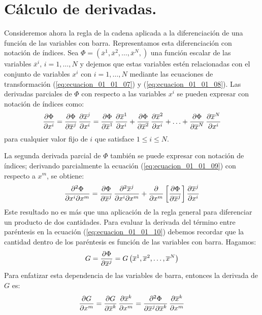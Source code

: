 \documentclass[hidelinks,12pt]{article}
\begin{document}
\section{Cálculo de derivadas.}

Consideremos ahora la regla de la cadena aplicada a la diferenciación de una función de las variables con barra. Representamos esta diferenciación con notación de índices. Sea $\Phi = \left( \overline{x}^{1},  \overline{x}^{2}, \ldots, \overline{x}^{N}, \right)$ una función escalar de las variables $\overline{x}^{i}, \, i = 1, \ldots, N$ y dejemos que estas variables estén relacionadas con el conjunto de variables $x^{i}$  con $i = 1, \ldots, N$ mediante las ecuaciones de transformación (\ref{eq:ecuacion_01_01_07}) y (\ref{eq:ecuacion_01_01_08}). Las derivadas parciales de $\Phi$ con respecto a las variables $x^{i}$ se pueden expresar con notación de índices como:
\begin{align}
\pdv{\Phi}{x^{i}} = \pdv{\Phi}{\overline{x}^{j}} \, \pdv{\overline{x}^{j}}{x^i} = \pdv{\Phi}{\overline{x}^{1}} \, \pdv{\overline{x}^{1}}{x^{i}} + \pdv{\Phi}{\overline{x}^{2}} \, \pdv{\overline{x}^{2}}{x^{i}} + \ldots + \pdv{\Phi}{\overline{x}^{N}} \, \pdv{\overline{x}^{N}}{x^{i}}
\label{eq:ecuacion_01_01_09}
\end{align}
para cualquier valor fijo de $i$ que satisface $1 \leq i \leq N$.
\par
La segunda derivada parcial de $\Phi$ también se puede expresar con notación de índices; derivando parcialmente la ecuación (\ref{eq:ecuacion_01_01_09}) con respecto a $x^{m}$, se obtiene:
\begin{align}
\pdv[2]{\Phi}{x^{i}}{x^{m}} = \pdv{\Phi}{\overline{x}^{j}} \, \pdv[2]{\overline{x}^{j}}{x^{i}}{x^{m}} + \pdv{x^{m}} \left[ \pdv{\Phi}{\overline{x}^{j}} \right] \pdv{\overline{x}^{j}}{x^{i}}
\label{eq:ecuacion_01_01_10}
\end{align}
Este resultado no es más que una aplicación de la regla general para diferenciar un producto de dos cantidades. Para evaluar la derivada del término entre paréntesis en la ecuación (\ref{eq:ecuacion_01_01_10}) debemos recordar que la cantidad dentro de los paréntesis es función de las variables con barra. Hagamos:
\begin{align*}
G = \pdv{\Phi}{\overline{x}^{j}} = G \left( \overline{x}^{1}, \overline{x}^{2}, \ldots, \overline{x}^{N} \right)
\end{align*}
Para enfatizar esta dependencia de las variables de barra, entonces la derivada de $G$ es:
\begin{align}
\pdv{G}{x^{m}} = \pdv{G}{\overline{x}^{k}} \, \pdv{\overline{x}^{k}}{x^{m}} = \pdv[2]{\Phi}{\overline{x}^{j}}{\overline{x}^{k}} \, \pdv{\overline{x}^{k}}{x^{m}}
\label{eq:ecuacion_01_01_11}
\end{align}
\end{document}
